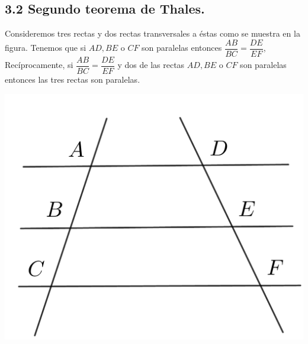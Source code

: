 \documentclass[12pt,a4paper]{article}
\begin{document}
\subsection*{3.2 Segundo teorema de Thales.}
Consideremos tres rectas y dos rectas transversales a éstas como se muestra en la figura. Tenemos que si $AD, BE$ o $CF$ son paralelas entonces $\dfrac{AB}{BC}=\dfrac{DE}{EF}$, Recíprocamente, si $\dfrac{AB}{BC}=\dfrac{DE}{EF}$ y dos de las rectas $AD, BE$ o $CF$ son paralelas entonces las tres rectas son paralelas.
\begin{center}
\includegraphics[scale=0.6]{Imagenes/thales.png} 
\end{center}
\end{document}
